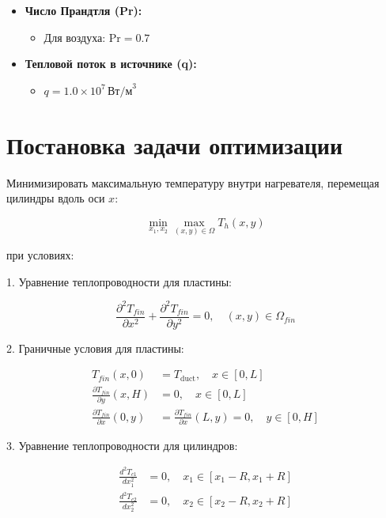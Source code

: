 \documentclass[a4paper,12pt]{article}
\theoremstyle{plain} %
\theoremstyle{definition} %
\theoremstyle{remark} %
\begin{document}
\begin{itemize}
	\item \textbf{Число Прандтля (Pr):}
	      \begin{itemize}
		      \item Для воздуха: $\text{Pr} = 0.7$
	      \end{itemize}
	      
	\item \textbf{Тепловой поток в источнике (q):}
	      \begin{itemize}
		      \item $q = 1.0 \times 10^7 \, \text{Вт/м}^3$
	      \end{itemize}
\end{itemize}

\section*{Постановка задачи оптимизации}

Минимизировать максимальную температуру внутри нагревателя, перемещая цилиндры вдоль оси $x$:

\begin{equation*}
	\min_{x_1, x_2} \max_{(x, y) \in \Omega} T_h(x, y)
\end{equation*}

при условиях:

1. Уравнение теплопроводности для пластины:

\begin{equation*}
	\frac{\partial^2 T_{fin}}{\partial x^2} + \frac{\partial^2 T_{fin}}{\partial y^2} = 0, \quad (x, y) \in \Omega_{fin}
\end{equation*}

2. Граничные условия для пластины:

\begin{align*}
	T_{fin}(x, 0)                             & = T_{\text{duct}}, \quad x \in [0, L]                               \\
	\frac{\partial T_{fin}}{\partial y}(x, H) & = 0, \quad x \in [0, L]                                             \\
	\frac{\partial T_{fin}}{\partial x}(0, y) & = \frac{\partial T_{fin}}{\partial x}(L, y) = 0, \quad y \in [0, H]
\end{align*}

3. Уравнение теплопроводности для цилиндров:

\begin{align*}
	\frac{d^2 T_{c1}}{dx_1^2} & = 0, \quad x_1 \in [x_1 - R, x_1 + R] \\
	\frac{d^2 T_{c2}}{dx_2^2} & = 0, \quad x_2 \in [x_2 - R, x_2 + R]
\end{align*}
\end{document}
